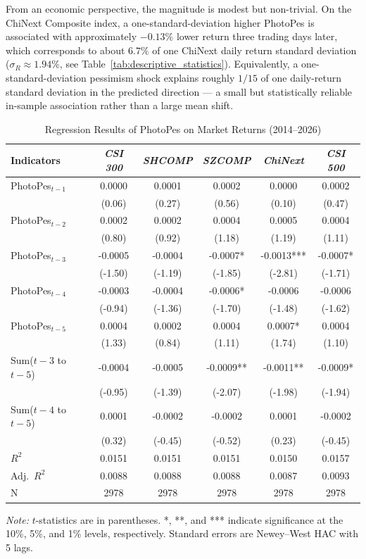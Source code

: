 \documentclass[AER]{AEA}
\begin{document}
From an economic perspective, the magnitude is modest but non-trivial. On the ChiNext Composite index, a one-standard-deviation higher PhotoPes is associated with approximately $-0.13\%$ lower return three trading days later, which corresponds to about $6.7\%$ of one ChiNext daily return standard deviation ($\sigma_R \approx 1.94\%$, see Table~\ref{tab:descriptive_statistics}). Equivalently, a one-standard-deviation pessimism shock explains roughly $1/15$ of one daily-return standard deviation in the predicted direction --- a small but statistically reliable in-sample association rather than a large mean shift.

\begin{table}[h!]
\caption{Regression Results of PhotoPes on Market Returns (2014--2026)}
\label{tab:PhotoPes_regression_results}
\centering
\setlength{\tabcolsep}{4pt}
\small
\begin{tabular}{lccccc}
\toprule
Indicators & \textit{CSI 300} & \textit{SHCOMP} & \textit{SZCOMP} & \textit{ChiNext} & \textit{CSI 500} \\
\midrule
PhotoPes$_{t-1}$ & 0.0000 & 0.0001 & 0.0002 & 0.0000 & 0.0002 \\
& (0.06) & (0.27) & (0.56) & (0.10) & (0.47) \\
PhotoPes$_{t-2}$ & 0.0002 & 0.0002 & 0.0004 & 0.0005 & 0.0004 \\
& (0.80) & (0.92) & (1.18) & (1.19) & (1.11) \\
PhotoPes$_{t-3}$ & -0.0005 & -0.0004 & -0.0007* & -0.0013*** & -0.0007* \\
& (-1.50) & (-1.19) & (-1.85) & (-2.81) & (-1.71) \\
PhotoPes$_{t-4}$ & -0.0003 & -0.0004 & -0.0006* & -0.0006 & -0.0006 \\
& (-0.94) & (-1.36) & (-1.70) & (-1.48) & (-1.62) \\
PhotoPes$_{t-5}$ & 0.0004 & 0.0002 & 0.0004 & 0.0007* & 0.0004 \\
& (1.33) & (0.84) & (1.11) & (1.74) & (1.10) \\
\midrule
Sum($t-3$ to $t-5$) & -0.0004 & -0.0005 & -0.0009** & -0.0011** & -0.0009* \\
& (-0.95) & (-1.39) & (-2.07) & (-1.98) & (-1.94) \\
Sum($t-4$ to $t-5$) & 0.0001 & -0.0002 & -0.0002 & 0.0001 & -0.0002 \\
& (0.32) & (-0.45) & (-0.52) & (0.23) & (-0.45) \\
\midrule
$R^2$ & 0.0151 & 0.0151 & 0.0151 & 0.0150 & 0.0157 \\
Adj.\ $R^2$ & 0.0088 & 0.0088 & 0.0088 & 0.0087 & 0.0093 \\
N & 2978 & 2978 & 2978 & 2978 & 2978 \\
\bottomrule
\end{tabular}

\vspace{0.2cm}
\footnotesize
\textit{Note:} $t$-statistics are in parentheses. *, **, and *** indicate significance at the 10\%, 5\%, and 1\% levels, respectively. Standard errors are Newey--West HAC with 5 lags.
\end{table}
\end{document}
